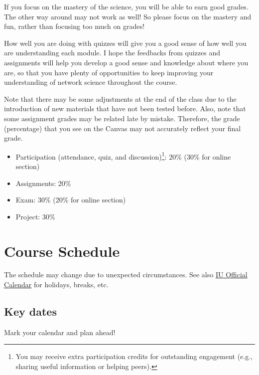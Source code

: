 \documentclass[11pt,article,oneside]{memoir} %
\begin{document}
If you focus on the mastery of the science, you will be able to earn good grades. The other way around may not work as well! So please focus on the mastery and fun, rather than focusing too much on grades! 

How well you are doing with quizzes will give you a good sense of how well you are understanding each module. I hope the feedbacks from quizzes and assignments will help you develop a good sense and knowledge about where you are, so that you have plenty of opportunities to keep improving your understanding of network science throughout the course. 

Note that there may be some adjustments at the end of the class due to the introduction of new materials that have not been tested before. Also, note that some assignment grades may be related late by mistake. Therefore, the grade (percentage) that you see on the Canvas may not accurately reflect your final grade.

\vspace{-10pt}
\begin{itemize}\itemsep=0pt

\item Participation (attendance, quiz, and discussion)\footnote{You may receive extra participation credits for outstanding engagement (e.g., sharing useful information or helping peers).}: 20\%  (30\% for online section)

\item Assignments: 20\%

\item Exam: 30\% (20\% for online section)

\item Project: 30\%

\end{itemize}
\section{Course Schedule} %

The schedule may change due to unexpected circumstances. See also \href{https://registrar.indiana.edu/official-calendar/index.shtml}{IU Official Calendar} for holidays, breaks, etc. 

\subsection{Key dates}\label{sub:key_dates} %

Mark your calendar and plan ahead!
\end{document}
